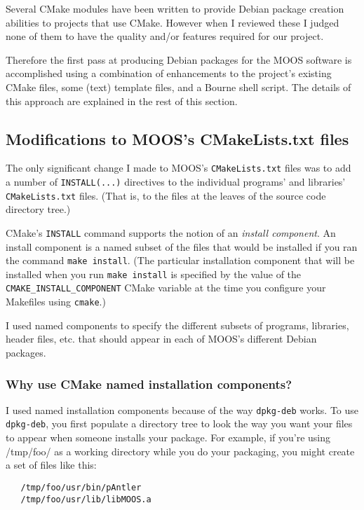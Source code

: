 \documentclass[letterpaper,10pt]{article}
\begin{document}
Several CMake modules have been written to provide Debian package creation
abilities to projects that use CMake.  However when I reviewed these I
judged none of them to have the quality and/or features required for our project.

Therefore the first pass at producing Debian packages for the MOOS software is
accomplished using a combination of enhancements to the project's existing
CMake files, some (text) template files, and a Bourne shell script.  The details
of this approach are explained in the rest of this section.

\subsection{Modifications to MOOS's CMakeLists.txt files}
The only significant change I made to MOOS's \verb|CMakeLists.txt| files was to
add a number of \verb|INSTALL(...)| directives to the individual programs' and
libraries' \verb|CMakeLists.txt| files. (That is, to the files at the leaves of the
source code directory tree.)

CMake's \verb|INSTALL| command supports the notion of an \textit{install 
component}.  An install component is a named subset of the files that would
be installed if you ran the command \verb|make install|.  (The particular
installation component that will be installed when you run \verb|make install|
is specified by the value of the \verb|CMAKE_INSTALL_COMPONENT| CMake variable
at the time you configure your Makefiles using \verb|cmake|.)

I used named components to specify the different subsets of programs, 
libraries, header files, etc. that should appear in each of MOOS's different
Debian packages.

\subsubsection{Why use CMake named installation components?}
I used named installation components because of the way \verb|dpkg-deb| works.
To use \verb|dpkg-deb|, you first populate a directory tree to look the way you
want your files to appear when someone installs your package.  For example, if 
you're using /tmp/foo/ as a working directory while you do your packaging, you
might create a set of files like this:
\begin{verbatim}
   /tmp/foo/usr/bin/pAntler
   /tmp/foo/usr/lib/libMOOS.a
\end{verbatim} 
\end{document}
